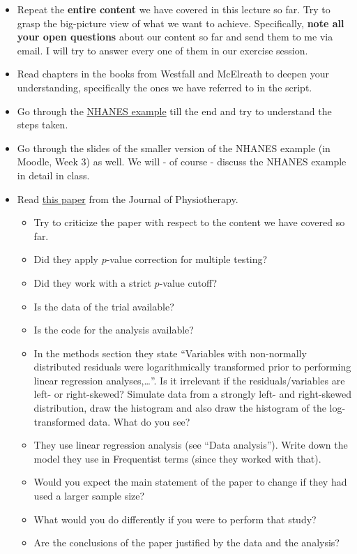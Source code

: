 \documentclass[
]{book}
\providecommand{\tightlist}{%
  \setlength{\itemsep}{0pt}\setlength{\parskip}{0pt}}
\begin{document}
\begin{itemize}
\item
  Repeat the \textbf{entire content} we have covered in this lecture so far.
  Try to grasp the big-picture view of what we want to achieve.
  Specifically, \textbf{note all your open questions} about our content so far
  and send them to me via email. I will try to answer every one of them
  in our exercise session.
\item
  Read chapters in the books from Westfall and McElreath to deepen your understanding, specifically the ones
  we have referred to in the script.
\item
  Go through the \href{https://jdegenfellner.github.io/Script_QM2_ZHAW/multiple-linear-regression.html\#example_nhanes}{NHANES example}
  till the end and try to understand the steps taken.
\item
  Go through the slides of the smaller version of the NHANES example (in Moodle, Week 3) as well.
  We will - of course - discuss the NHANES example in detail in class.
\item
  Read \href{https://www.sciencedirect.com/science/article/pii/S1836955314000083}{this paper}
  from the Journal of Physiotherapy.

  \begin{itemize}
  \tightlist
  \item
    Try to criticize the paper with respect to the content we have covered so far.
  \item
    Did they apply \(p\)-value correction for multiple testing?
  \item
    Did they work with a strict \(p\)-value cutoff?
  \item
    Is the data of the trial available?
  \item
    Is the code for the analysis available?
  \item
    In the methods section they state ``Variables with non-normally distributed residuals were logarithmically
    transformed prior to performing linear regression analyses,\ldots{}''. Is it irrelevant if the residuals/variables
    are left- or right-skewed? Simulate data from a strongly left- and right-skewed distribution,
    draw the histogram and also draw the histogram of the log-transformed data. What do you see?
  \item
    They use linear regression analysis (see ``Data analysis''). Write down the model they use in Frequentist terms
    (since they worked with that).
  \item
    Would you expect the main statement of the paper to change if they had used a larger sample size?
  \item
    What would you do differently if you were to perform that study?
  \item
    Are the conclusions of the paper justified by the data and the analysis?
  \end{itemize}
\end{itemize}
\end{document}
